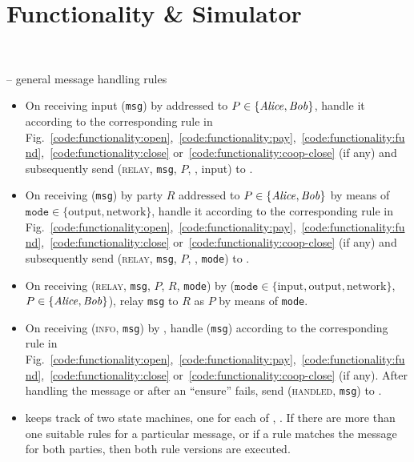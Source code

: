 \section{Functionality \& Simulator} \ \\
\label{sec:functionality}

\begin{center}
  \begin{systembox}{\fchan{} -- general message handling rules}
    \begin{itemize}
      \item On receiving input (\texttt{msg}) by \environment addressed to $P
      \in \{\mathit{Alice}, \mathit{Bob}\}$, handle it according to the corresponding rule in
      Fig.~\ref{code:functionality:open},~\ref{code:functionality:pay},~\ref{code:functionality:fund},~\ref{code:functionality:close}
      or~\ref{code:functionality:coop-close} (if any) and subsequently send
      (\textsc{relay}, \texttt{msg}, $P$, \environment, input) to \adversary.
      \item On receiving (\texttt{msg}) by party $R$ addressed to $P \in \{\mathit{Alice}, \mathit{Bob}\}$
      by means of $\texttt{mode} \in \{\mathrm{output},
      \mathrm{network}\}$, handle it according to the corresponding rule in
      Fig.~\ref{code:functionality:open},~\ref{code:functionality:pay},~\ref{code:functionality:fund},~\ref{code:functionality:close}
      or~\ref{code:functionality:coop-close} (if any) and subsequently send
      (\textsc{relay}, \texttt{msg}, $P$, \environment, \texttt{mode}) to
      \adversary. 
      \item On receiving (\textsc{relay}, \texttt{msg}, $P$, $R$, \texttt{mode})
      by \adversary ($\texttt{mode} \in \{\mathrm{input}, \mathrm{output},
      \mathrm{network}\}$, $P \in \{\mathit{Alice}, \mathit{Bob}\}$), relay \texttt{msg} to $R$
      as $P$ by means of \texttt{mode}. 
      \item On receiving (\textsc{info}, \texttt{msg}) by \adversary, handle
      (\texttt{msg}) according to the corresponding rule in
      Fig.~\ref{code:functionality:open},~\ref{code:functionality:pay},~\ref{code:functionality:fund},~\ref{code:functionality:close}
      or~\ref{code:functionality:coop-close} (if any). After handling the message or
      after an ``ensure'' fails, send (\textsc{handled}, \texttt{msg}) to
      \adversary. 
      \item \fchan keeps track of two state machines, one for each of \alice,
      \bob. If there are more than one suitable rules for a particular message,
      or if a rule matches the message for both parties, then both rule versions
      are executed. 
    \end{itemize}
  \end{systembox}
  \label{code:functionality:rules}
\end{center}

